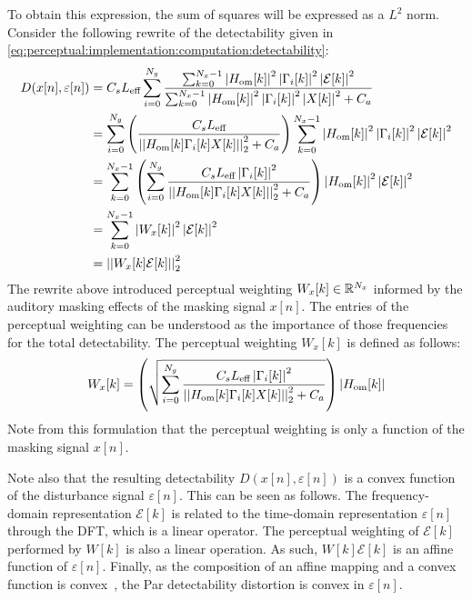 To obtain this expression, the sum of squares will be expressed as a $L^2$ norm.
Consider the following rewrite of the detectability given in 
\autoref{eq:perceptual:implementation:computation:detectability}: 
\begin{align*}
    D(x[n],\varepsilon[n]) &= C_s L_\text{eff}\sum_{i=0}^{N_g}
                        \frac{\sum_{k=0}^{N_x-1}\left|H_\text{om}[k]\right|^2\left|
                            \Gamma_i[k]\right|^2\left|\mathcal{E}[k]\right|^2}
                        {\sum_{k=0}^{N_x-1}\left|H_\text{om}[k]\right|^2\left|
                            \Gamma_i[k]\right|^2\left|X[k]\right|^2 + C_a} \\
                           &= \sum_{i=0}^{N_g}
                           \left(\frac{C_s L_\text{eff}}{\norm[2][2]{H_\text{om}[k]\Gamma_i[k]X[k]} + C_a}\right)
                        \sum_{k=0}^{N_x-1}\left|H_\text{om}[k]\right|^2\left|
                        \Gamma_i[k]\right|^2\left|\mathcal{E}[k]\right|^2 \\
                           &= \sum_{k=0}^{N_x-1}\left(\sum_{i=0}^{N_g}
                            \frac{C_s L_\text{eff}\left|\Gamma_i[k]\right|^2}
                                 {\norm[2][2]{H_\text{om}[k]\Gamma_i[k]X[k]} + C_a}\right)
                        \left|H_\text{om}[k]\right|^2\left|\mathcal{E}[k]\right|^2 \\
                           &= \sum_{k=0}^{N_x-1}\left|W_x[k]\right|^2\left|\mathcal{E}[k]\right|^2 \\
                           &= \norm[2][2]{W_x[k]\mathcal{E}[k]} 
\end{align*}
The rewrite above introduced perceptual weighting $W_x[k]\in\mathbb{R}^{N_x}$ informed by the auditory masking effects of the masking signal $x[n]$. 
The entries of the perceptual weighting can be understood as the importance of those frequencies for the total detectability.
The perceptual weighting $W_x[k]$ is defined as follows: 
\begin{equation}
    W_x[k] = \left(\sqrt{\sum_{i=0}^{N_g}\frac{C_s L_\text{eff}\left|\Gamma_i[k]\right|^2}
        {\norm[2][2]{H_\text{om}[k]\Gamma_i[k]X[k]} + C_a}}\right)
        \left|H_\text{om}[k]\right|
\end{equation}
Note from this formulation that the perceptual weighting is only a function of the masking signal $x[n]$.

Note also that the resulting detectability $D(x[n],\varepsilon[n])$ is a convex function 
of the disturbance signal $\varepsilon[n]$. 
This can be seen as follows.
The frequency-domain representation $\mathcal{E}[k]$ is related to the 
time-domain representation $\varepsilon[n]$ through the DFT, which is a linear operator.
The perceptual weighting of $\mathcal{E}[k]$ performed by $W[k]$ is also a linear operation.
As such, $W[k]\mathcal{E}[k]$ is an affine function of $\varepsilon[n]$.
Finally, as the composition of an affine mapping and a convex function is convex~\cite{boyd2004convex},
the Par detectability distortion
is convex in $\varepsilon[n]$.

